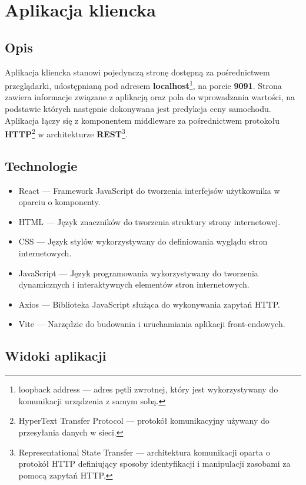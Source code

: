 \documentclass[12pt, a4paper]{report}
\begin{document}
\chapter{Aplikacja kliencka}
\section{Opis}
Aplikacja kliencka stanowi pojedynczą stronę dostępną za pośrednictwem przeglądarki,
udostępnianą pod adresem \textbf{localhost}\footnote{loopback address --- adres pętli zwrotnej, który jest wykorzystywany do komunikacji urządzenia z samym sobą.},
na porcie \textbf{9091}. Strona zawiera informacje związane z aplikacją oraz pola do wprowadzania wartości,
na podstawie których następnie dokonywana jest predykcja ceny samochodu. Aplikacja łączy się z komponentem
middleware za pośrednictwem protokołu \textbf{HTTP}\footnote{HyperText Transfer Protocol --- protokół komunikacyjny używany do przesyłania danych w sieci.}
 w architekturze 
\textbf{REST}\footnote{Representational State Transfer --- architektura komunikacji oparta o protokół HTTP
    definiujący sposoby identyfikacji i manipulacji zasobami za pomocą zapytań HTTP.}.\@
\section{Technologie}
\begin{itemize}
    \item React --- Framework JavaScript do tworzenia interfejsów użytkownika w oparciu o komponenty.
    \item HTML --- Język znaczników do tworzenia struktury strony internetowej.
    \item CSS --- Język stylów wykorzystywany do definiowania wyglądu stron internetowych.
    \item JavaScript --- Język programowania wykorzystywany do tworzenia dynamicznych i interaktywnych elementów stron internetowych.
    \item Axios --- Biblioteka JavaScript służąca do wykonywania zapytań HTTP.\@
    \item Vite --- Narzędzie do budowania i uruchamiania aplikacji front-endowych. 
\end{itemize}
\newpage
\section{Widoki aplikacji}
\end{document}
